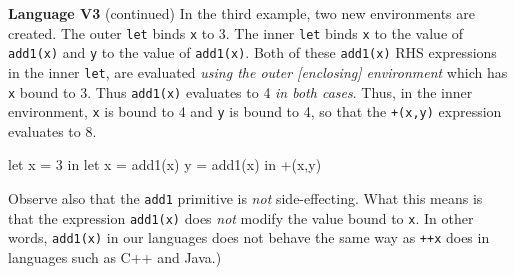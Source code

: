 \begin{minipage}[t]{\sw}
\slidenumber
\LARGE
{\bf Language V3} (continued)\exx
In the third example, two new environments are created.
The outer \verb'let' binds \verb'x' to 3.
The inner \verb'let' binds \verb'x'
to the value of \verb'add1(x)'
and \verb'y' to the value of \verb'add1(x)'.
Both of these \verb'add1(x)' RHS expressions in the inner \verb'let',
are evaluated {\em using the outer [enclosing] environment}
which has \verb'x' bound to 3.
Thus \verb'add1(x)' evaluates to 4 {\em in both cases}.
Thus, in the inner environment,
\verb'x' is bound to 4 and \verb'y' is bound to 4,
so that the \verb'+(x,y)' expression evaluates to 8.
{\Large
\begin{qv}
let x = 3
in
  let
    x = add1(x)
    y = add1(x)
  in
    +(x,y)
\end{qv}
}
Observe also that the \verb'add1' primitive is {\em not} side-effecting.
What this means is that the expression \verb'add1(x)'
does {\em not} modify the value bound to \verb'x'.
In other words, \verb'add1(x)' in our languages
does not behave the same way as \verb'++x' does
in languages such as C++ and Java.)
\end{minipage}
\clearpage
